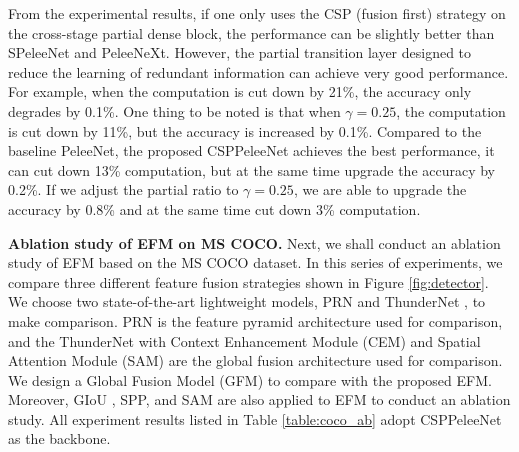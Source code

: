 \documentclass{article}
\begin{document}
From the experimental results, if one only uses the CSP (fusion first) strategy on the cross-stage partial dense block, the performance can be slightly better than SPeleeNet and PeleeNeXt.  However, the partial transition layer designed to reduce the learning of redundant information can achieve very good performance.  For example, when the computation is cut down by 21\%, the accuracy only degrades by 0.1\%.  One thing to be noted is that when $\gamma = 0.25$, the computation is cut down by 11\%, but the accuracy is increased by 0.1\%.  Compared to the baseline PeleeNet, the proposed CSPPeleeNet achieves the best performance, it can cut down 13\% computation, but at the same time upgrade the accuracy by 0.2\%.  If we adjust the partial ratio to $\gamma = 0.25$, we are able to upgrade the accuracy by 0.8\% and at the same time cut down 3\% computation.

{\bf Ablation study of EFM on MS COCO.} Next, we shall conduct an ablation study of EFM based on the MS COCO dataset.  In this series of experiments, we compare three different feature fusion strategies shown in Figure \ref{fig:detector}.  We choose two state-of-the-art lightweight models, PRN \cite{wang2019enriching} and ThunderNet \cite{qin2019thundernet}, to make comparison.  PRN is the feature pyramid architecture used for comparison, and the ThunderNet with Context Enhancement Module (CEM) and Spatial Attention Module (SAM) are the global fusion architecture used for comparison.  We design a Global Fusion Model (GFM) to compare with the proposed EFM.  Moreover, GIoU \cite{rezatofighi2019generalized}, SPP, and SAM are also applied to EFM to conduct an ablation study.  All experiment results listed in Table \ref{table:coco_ab} adopt CSPPeleeNet as the backbone.
\end{document}
